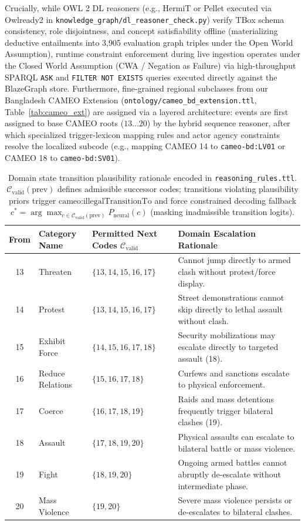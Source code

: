 \documentclass[11pt,a4paper]{article}
\begin{document}
Crucially, while OWL 2 DL reasoners (e.g., HermiT or Pellet executed via Owlready2 in \texttt{knowledge\_graph/dl\_reasoner\_check.py}) verify TBox schema consistency, role disjointness, and concept satisfiability offline (materializing deductive entailments into 3,905 evaluation graph triples under the Open World Assumption), runtime constraint enforcement during live ingestion operates under the Closed World Assumption (CWA / Negation as Failure) via high-throughput SPARQL \texttt{ASK} and \texttt{FILTER NOT EXISTS} queries executed directly against the BlazeGraph store.
Furthermore, fine-grained regional subclasses from our Bangladesh CAMEO Extension (\texttt{ontology/cameo\_bd\_extension.ttl}, Table~\ref{tab:cameo_ext}) are assigned via a layered architecture: events are first assigned to base CAMEO roots ($13 \dots 20$) by the hybrid sequence reasoner, after which specialized trigger-lexicon mapping rules and actor agency constraints resolve the localized subcode (e.g., mapping CAMEO 14 to \texttt{cameo-bd:LV01} or CAMEO 18 to \texttt{cameo-bd:SV01}).

\begin{table}[h]
\centering
\small
\caption{Domain state transition plausibility rationale encoded in \texttt{reasoning\_rules.ttl}. $\mathcal{C}_{\text{valid}}(\text{prev})$ defines admissible successor codes; transitions violating plausibility priors trigger $\text{cameo:illegalTransitionTo}$ and force constrained decoding fallback $c^* = \arg\max_{c \in \mathcal{C}_{\text{valid}}(\text{prev})} P_{\text{neural}}(c)$ (masking inadmissible transition logits).}
\label{tab:transition_matrix}
\begin{tabular}{cllp{5cm}}
\toprule
\textbf{From} & \textbf{Category Name} & \textbf{Permitted Next Codes $\mathcal{C}_{\text{valid}}$} & \textbf{Domain Escalation Rationale} \\
\midrule
13 & Threaten & $\{13, 14, 15, 16, 17\}$ & Cannot jump directly to armed clash without protest/force display. \\
14 & Protest & $\{13, 14, 15, 16, 17\}$ & Street demonstrations cannot skip directly to lethal assault without clash. \\
15 & Exhibit Force & $\{14, 15, 16, 17, 18\}$ & Security mobilizations may escalate directly to targeted assault (18). \\
16 & Reduce Relations & $\{15, 16, 17, 18\}$ & Curfews and sanctions escalate to physical enforcement. \\
17 & Coerce & $\{16, 17, 18, 19\}$ & Raids and mass detentions frequently trigger bilateral clashes (19). \\
18 & Assault & $\{17, 18, 19, 20\}$ & Physical assaults can escalate to bilateral battle or mass violence. \\
19 & Fight & $\{18, 19, 20\}$ & Ongoing armed battles cannot abruptly de-escalate without intermediate phase. \\
20 & Mass Violence & $\{19, 20\}$ & Severe mass violence persists or de-escalates to bilateral clashes. \\
\bottomrule
\end{tabular}
\end{table}
\end{document}
